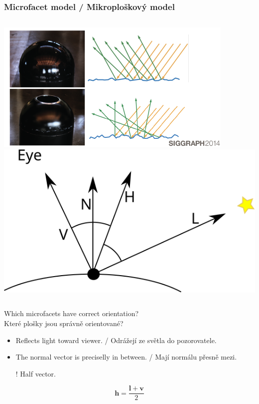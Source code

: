 \begin{frame}\frametitle{Microfacet model / Mikroploškový model}

    \begin{columns}[c]
    \includegraphics[width=\textwidth]{pics/physicallyBasedRendering/mf}
    \includegraphics[width=\textwidth]{pics/physicallyBasedRendering/half}
    \end{columns}

    Which microfacets have correct orientation?\\
    Které plošky jsou správně orientované?
    \pause
    \begin{itemize}
        \item Reflects light toward viewer. / Odrážejí ze světla do pozorovatele.
        \item The normal vector is preciselly in between. / Mají normálu přesně mezi.
        \item[!] Half vector.
    \end{itemize}
    \begin{equation*}
        \mathbf h = \frac{\mathbf l + \mathbf v}{2}
    \end{equation*}
\end{frame}

